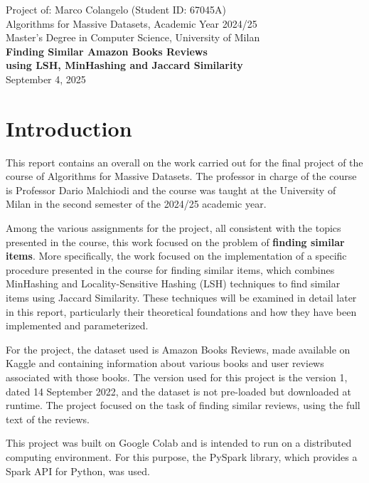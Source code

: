 \documentclass[12pt, a4paper[]{article}
\begin{document}
\thispagestyle{empty}
\begin{center}
    \vspace*{3cm}
    {\large Project of: Marco Colangelo (Student ID: 67045A)}\\[0.3cm]
    {\large Algorithms for Massive Datasets, Academic Year 2024/25}\\[0.3cm]
    {\large Master's Degree in Computer Science, University of Milan}\\[1.2cm]

    {\LARGE\bfseries
    Finding Similar Amazon Books Reviews\\
    using LSH, MinHashing and Jaccard Similarity}\\[1.2cm]

    {\large September 4, 2025}
\end{center}

\setcounter{page}{1}

\section{Introduction}
This report contains an overall on the work carried out for the final project of the course of Algorithms for Massive Datasets. The professor in charge of the course is Professor Dario Malchiodi and the course was taught at the University of Milan in the second semester of the 2024/25 academic year.

Among the various assignments for the project, all consistent with the topics presented in the course, this work focused on the problem of \textbf{finding similar items}. More specifically, the work focused on the implementation of a specific procedure presented in the course for finding similar items, which combines MinHashing and Locality-Sensitive Hashing (LSH) techniques to find similar items using Jaccard Similarity. These techniques will be examined in detail later in this report, particularly their theoretical foundations and how they have been implemented and parameterized.

For the project, the dataset used is Amazon Books Reviews, made available on Kaggle and containing information about various books and user reviews associated with those books. The version used for this project is the version 1, dated 14 September 2022, and the dataset is not pre-loaded but downloaded at runtime. The project focused on the task of finding similar reviews, using the full text of the reviews.

This project was built on Google Colab and is intended to run on a distributed computing environment. For this purpose, the PySpark library, which provides a Spark API for Python, was used. 
\end{document}
